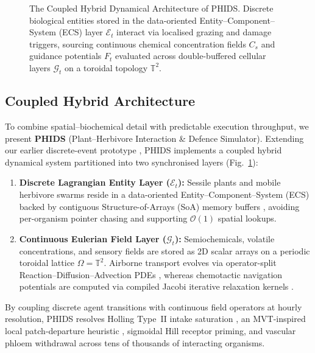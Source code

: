 \begin{figure}[t]
  \centering
  
  \caption{The Coupled Hybrid Dynamical Architecture of PHIDS. Discrete biological entities stored in the data-oriented Entity--Component--System (ECS) layer $\mathcal{E}_t$ interact via localised grazing and damage triggers, sourcing continuous chemical concentration fields $C_s$ and guidance potentials $F_t$ evaluated across double-buffered cellular layers $\mathcal{G}_t$ on a toroidal topology $\mathbb{T}^2$.}
  \label{fig:architectural_paradigm}
\end{figure}

\subsection{Coupled Hybrid Architecture}
\label{sec:intro_architectural_vision}

To combine spatial--biochemical detail with predictable execution throughput, we present \textbf{PHIDS} (Plant--Herbivore Interaction \& Defence Simulator). Extending our earlier discrete-event prototype \cite{dietrich2025visual}, PHIDS implements a coupled hybrid dynamical system \cite{swat2012multiscale, topping2003almass, bravo2020hybrid, husar2024mcell4} partitioned into two synchronised layers (Fig.~\ref{fig:architectural_paradigm}):
\begin{enumerate}
  \item \textbf{Discrete Lagrangian Entity Layer ($\mathcal{E}_t$):} Sessile plants and mobile herbivore swarms reside in a data-oriented Entity--Component--System (ECS) backed by contiguous Structure-of-Arrays (SoA) memory buffers \cite{lam2015numba, harris2020array}, avoiding per-organism pointer chasing and supporting $\mathcal{O}(1)$ spatial lookups.
  \item \textbf{Continuous Eulerian Field Layer ($\mathcal{G}_t$):} Semiochemicals, volatile concentrations, and sensory fields are stored as 2D scalar arrays on a periodic toroidal lattice $\Omega = \mathbb{T}^2$. Airborne transport evolves via operator-split Reaction--Diffusion--Advection PDEs \cite{strang1968construction, leveque2002finite}, whereas chemotactic navigation potentials are computed via compiled Jacobi iterative relaxation kernels \cite{lam2015numba}.
\end{enumerate}

By coupling discrete agent transitions with continuous field operators at hourly resolution, PHIDS resolves Holling Type~II intake saturation \cite{holling1959components}, an MVT-inspired local patch-departure heuristic \cite{charnov1976optimal}, sigmoidal Hill receptor priming, and vascular phloem withdrawal \cite{schwachtje2006snf1} across tens of thousands of interacting organisms.

